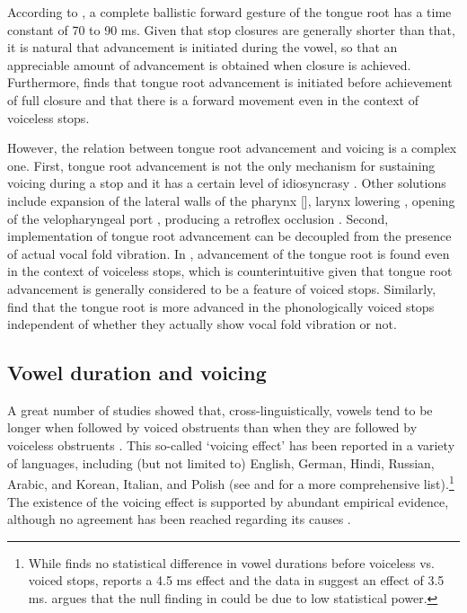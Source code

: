 \documentclass[12pt,]{article}
\let\rmarkdownfootnote\footnote%
\def\footnote{\protect\rmarkdownfootnote}
\begin{document}
According to \citet{rothenberg1967}, a complete ballistic forward
gesture of the tongue root has a time constant of 70 to 90 ms. Given
that stop closures are generally shorter than that, it is natural that
advancement is initiated during the vowel, so that an appreciable amount
of advancement is obtained when closure is achieved. Furthermore,
\citet{westbury1983} finds that tongue root advancement is initiated
before achievement of full closure and that there is a forward movement
even in the context of voiceless stops.

However, the relation between tongue root advancement and voicing is a
complex one. First, tongue root advancement is not the only mechanism
for sustaining voicing during a stop
\citep{rothenberg1967, westbury1983, ohala2011} and it has a certain
level of idiosyncrasy \citep{ahn2016}. Other solutions include expansion
of the lateral walls of the pharynx {[}{]}, larynx lowering
\citep{riordan1980}, opening of the velopharyngeal port
\citep{yanagihara1966}, producing a retroflex occlusion
\citep{sprouse2008}. Second, implementation of tongue root advancement
can be decoupled from the presence of actual vocal fold vibration. In
\citet{westbury1983}, advancement of the tongue root is found even in
the context of voiceless stops, which is counterintuitive given that
tongue root advancement is generally considered to be a feature of
voiced stops. Similarly, \citet{ahn2015, ahn2016, ahn2018} find that the
tongue root is more advanced in the phonologically voiced stops
independent of whether they actually show vocal fold vibration or not.

\subsection{Vowel duration and
voicing}\label{vowel-duration-and-voicing}

A great number of studies showed that, cross-linguistically, vowels tend
to be longer when followed by voiced obstruents than when they are
followed by voiceless obstruents
\citep{house1953, peterson1960, chen1970, klatt1973, lisker1974, farnetani1986, fowler1992, hussein1994, esposito2002, lampp2004, durvasula2012}.
This so-called `voicing effect' has been reported in a variety of
languages, including (but not limited to) English, German, Hindi,
Russian, Arabic, and Korean, Italian, and Polish (see
\citealt{maddieson1976} and \citealt{begus2017} for a more comprehensive
list).\footnote{While \citet{keating1984} finds no statistical difference in vowel durations before voiceless vs. voiced stops, \citet{nowak2006} reports a 4.5 ms effect and the data in \citet{malisz2008} suggest an effect of 3.5 ms. \citet{begus2017} argues that the null finding in \citet{keating1984} could be due to low statistical power.}
The existence of the voicing effect is supported by abundant empirical
evidence, although no agreement has been reached regarding its causes
\citep{durvasula2012, soskuthy2013}.
\end{document}
